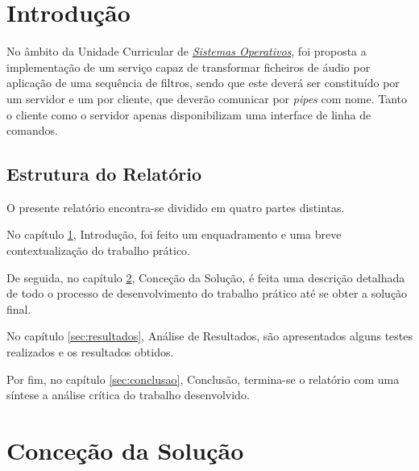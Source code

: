 \documentclass[a4paper, 11pt]{article}
\begin{document}
\pagebreak

\tableofcontents
\listoffigures

\pagebreak


\pagestyle{fancy}
\fancyhf{}


\renewcommand{\headrulewidth}{0pt}


\section{Introdução}
\label{sec:introducao}

No âmbito da Unidade Curricular de 
\href{http://miei.di.uminho.pt/plano_estudos.html#sistemas_operativos}{\emph {Sistemas 
Operativos}}, foi proposta a implementação de um serviço capaz de transformar ficheiros de 
áudio por aplicação de uma sequência de filtros, sendo que este deverá ser constituído por um 
servidor e um por cliente, que deverão comunicar por \textit{pipes} com nome. Tanto o cliente como 
o servidor apenas disponibilizam uma interface de linha de comandos.

\subsection*{Estrutura do Relatório}

O presente relatório encontra-se dividido em quatro partes distintas.

No capítulo \ref{sec:introducao}, Introdução, foi feito um enquadramento e uma breve 
contextualização do trabalho prático. 

De seguida, no capítulo \ref{sec:solucao}, Conceção da Solução, é feita uma descrição 
detalhada de todo o processo de desenvolvimento do trabalho prático até se obter a solução 
final.

No capítulo \ref{sec:resultados}, Análise de Resultados, são apresentados alguns testes 
realizados e os resultados obtidos.


Por fim, no capítulo \ref{sec:conclusao}, Conclusão, termina-se o relatório com uma síntese a 
análise
crítica do trabalho desenvolvido.

\pagebreak

\section{Conceção da Solução}
\label{sec:solucao}
\end{document}
